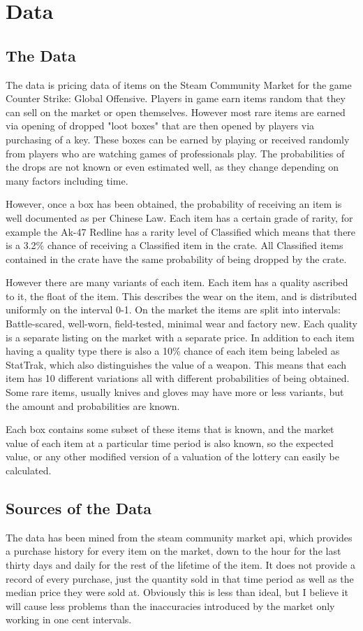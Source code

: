 \documentclass[11pt]{article}
\begin{document}
\section{Data}
\label{sec-3}
\subsection{The Data}
\label{sec-3-1}
The data is pricing data of items on the Steam Community Market for
the game Counter Strike: Global Offensive. Players in game earn items
random that they can sell on the market or open themselves. However
most rare items are earned via opening of dropped "loot boxes" that
are then opened by players via purchasing of a key. These boxes can be
earned by playing or received randomly from players who are watching
games of professionals play. The probabilities of the drops are not
known or even estimated well, as they change depending on many factors
including time. 

However, once a box has been obtained, the probability of receiving an
item is well documented as per Chinese Law. Each item has a certain
grade of rarity, for example the Ak-47 Redline has a rarity level of
Classified which means that there is a 3.2\% chance of receiving a
Classified item in the crate. All Classified items contained in the
crate have the same probability of being dropped by the crate.

However there are many variants of each item. Each item has a quality
ascribed to it, the float of the item. This describes the wear on the
item, and is distributed uniformly on the interval 0-1. On the market
the items are split into intervals: Battle-scared, well-worn,
field-tested, minimal wear and factory new. Each quality is a separate
listing on the market with a separate price. In addition to each item
having a quality type there is also a 10\% chance of each item being
labeled as StatTrak, which also distinguishes the value of a
weapon. This means that each item has 10 different variations all with
different probabilities of being obtained. Some rare items, usually
knives and gloves may have more or less variants, but the amount and
probabilities are known.

Each box contains some subset of these items that is known, and the
market value of each item at a particular time period is also known,
so the expected value, or any other modified version of a valuation of
the lottery can easily be calculated. 

\subsection{Sources of the Data}
\label{sec-3-2}
The data has been mined from the steam community market api, which
provides a purchase history for every item on the market, down to the
hour for the last thirty days and daily for the rest of the lifetime
of the item. It does not provide a record of every purchase, just the
quantity sold in that time period as well as the median price they
were sold at. Obviously this is less than ideal, but I believe it will
cause less problems than the inaccuracies introduced by the market only
working in one cent intervals.
\end{document}
